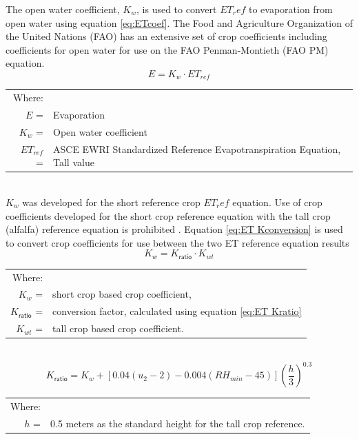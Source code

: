 \begin{linenumbers}
The open water coefficient, $K_w$, is used to convert $ET_ref$ to evaporation from open water using equation \ref{eq:ETcoef}.  The Food and Agriculture Organization of the United Nations (FAO) has an extensive set of crop coefficients including coefficients for open water for use on the FAO Penman-Montieth (FAO PM) equation.  
\begin{equation}
\label{eq:ETcoef}
E=K_w \cdot ET_{ref}
\end{equation}
\begin{tabular}{r l}
Where:&\\
$E$ = & Evaporation\\
$K_w$ = & Open water coefficient\\
$ET_{ref}$ = & ASCE EWRI Standardized Reference Evapotranspiration Equation, Tall value\\
\end{tabular}\\

$K_w$ was developed for the short reference crop $ET_ref$ equation.  Use of crop coefficients developed for the short crop reference equation with the tall crop (alfalfa) reference equation is prohibited  \citep{FAO56, Allen2011}.  Equation \ref{eq:ET Kconversion} is used to convert crop coefficients for use between the two ET reference equation results \citep{FAO56}
\begin{equation}
\label{eq:ET Kconversion}
	K_{w}=K_\mathsf{ratio} \cdot K_{wt}
\end{equation}
\begin{tabular}{r l}
Where:&\\
$K_{w}$ =& short crop based crop coefficient, \\
$K_\mathsf{ratio}$ =& conversion factor, calculated using equation \ref{eq:ET Kratio}\\
$K_{wt}$ =& tall crop based crop coefficient.\\
\end{tabular}\\

\begin{equation}
\label{eq:ET Kratio}
	K_\mathsf{ratio}=K_{w}+[0.04(u_2-2)-0.004(RH_{min}-45)] \left(\frac{h}{3} \right)^{0.3}
\end{equation}
\begin{tabular}{r l}
Where:&\\
$h$ =& 0.5 meters as the standard height for the tall crop reference.
\end{tabular}\\


\end{linenumbers}
